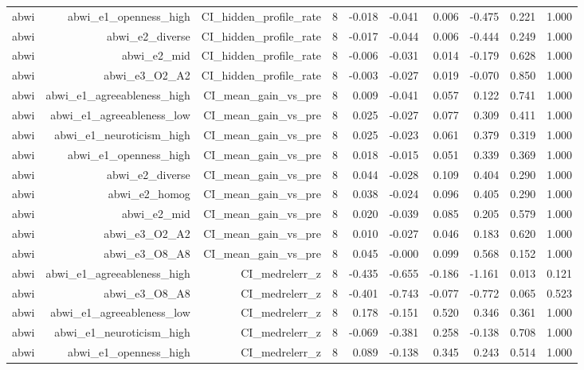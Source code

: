 \documentclass[11pt]{article}
\begin{document}
\begin{landscape}
\begin{longtable}{@{}lrrrrrrrrr@{}}
abwi & abwi\_e1\_openness\_high & CI\_hidden\_profile\_rate & 8 & -0.018 & -0.041 & 0.006 & -0.475 & 0.221 & 1.000 \\
abwi & abwi\_e2\_diverse & CI\_hidden\_profile\_rate & 8 & -0.017 & -0.044 & 0.006 & -0.444 & 0.249 & 1.000 \\
abwi & abwi\_e2\_mid & CI\_hidden\_profile\_rate & 8 & -0.006 & -0.031 & 0.014 & -0.179 & 0.628 & 1.000 \\
abwi & abwi\_e3\_O2\_A2 & CI\_hidden\_profile\_rate & 8 & -0.003 & -0.027 & 0.019 & -0.070 & 0.850 & 1.000 \\
abwi & abwi\_e1\_agreeableness\_high & CI\_mean\_gain\_vs\_pre & 8 & 0.009 & -0.041 & 0.057 & 0.122 & 0.741 & 1.000 \\
abwi & abwi\_e1\_agreeableness\_low & CI\_mean\_gain\_vs\_pre & 8 & 0.025 & -0.027 & 0.077 & 0.309 & 0.411 & 1.000 \\
abwi & abwi\_e1\_neuroticism\_high & CI\_mean\_gain\_vs\_pre & 8 & 0.025 & -0.023 & 0.061 & 0.379 & 0.319 & 1.000 \\
abwi & abwi\_e1\_openness\_high & CI\_mean\_gain\_vs\_pre & 8 & 0.018 & -0.015 & 0.051 & 0.339 & 0.369 & 1.000 \\
abwi & abwi\_e2\_diverse & CI\_mean\_gain\_vs\_pre & 8 & 0.044 & -0.028 & 0.109 & 0.404 & 0.290 & 1.000 \\
abwi & abwi\_e2\_homog & CI\_mean\_gain\_vs\_pre & 8 & 0.038 & -0.024 & 0.096 & 0.405 & 0.290 & 1.000 \\
abwi & abwi\_e2\_mid & CI\_mean\_gain\_vs\_pre & 8 & 0.020 & -0.039 & 0.085 & 0.205 & 0.579 & 1.000 \\
abwi & abwi\_e3\_O2\_A2 & CI\_mean\_gain\_vs\_pre & 8 & 0.010 & -0.027 & 0.046 & 0.183 & 0.620 & 1.000 \\
abwi & abwi\_e3\_O8\_A8 & CI\_mean\_gain\_vs\_pre & 8 & 0.045 & -0.000 & 0.099 & 0.568 & 0.152 & 1.000 \\
abwi & abwi\_e1\_agreeableness\_high & CI\_medrelerr\_z & 8 & -0.435 & -0.655 & -0.186 & -1.161 & 0.013 & 0.121 \\
abwi & abwi\_e3\_O8\_A8 & CI\_medrelerr\_z & 8 & -0.401 & -0.743 & -0.077 & -0.772 & 0.065 & 0.523 \\
abwi & abwi\_e1\_agreeableness\_low & CI\_medrelerr\_z & 8 & 0.178 & -0.151 & 0.520 & 0.346 & 0.361 & 1.000 \\
abwi & abwi\_e1\_neuroticism\_high & CI\_medrelerr\_z & 8 & -0.069 & -0.381 & 0.258 & -0.138 & 0.708 & 1.000 \\
abwi & abwi\_e1\_openness\_high & CI\_medrelerr\_z & 8 & 0.089 & -0.138 & 0.345 & 0.243 & 0.514 & 1.000 \\

\end{longtable}
\end{landscape}
\end{document}

